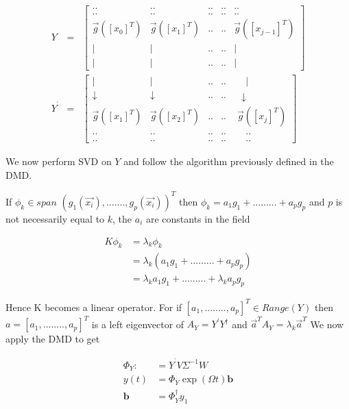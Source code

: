 \documentclass[12pt]{report}
\begin{document}
\begin{eqnarray*}
Y &=&%
\begin{bmatrix}
.. & .. & .. & .. & .. \\ 
.. & .. & .. & .. & .. \\ 
\vec{g}([x_{0}]^{T}) & \vec{g}([x_{1}]^{T}) & .. & ..
& \vec{g}([x_{j-1}]^{T}) \\ 
| & | & .. & .. & | \\
| & | & .. & .. & |%
\end{bmatrix}
\\
Y^{^{\prime }} &=&%
\begin{bmatrix}
| & | & .. & .. & \phantom{-}| \\ 
\downarrow  & \downarrow  & .. & .. & \phantom{p}\downarrow  \\ 
\vec{g}([x_{1}]^{T}) & \vec{g}([x_{2}]^{T}) & .. & ..
& \phantom{i}\vec{g}([x_{j}]^{T}) \\ 
.. & .. & .. & .. & \phantom{-}.. \\ 
.. & .. & .. & .. & \phantom{-}..%
\end{bmatrix}%
\end{eqnarray*}

We now perform SVD on $Y$ and follow the algorithm previously defined in the DMD.

If $\phi _{k}\in span$ $(g_{1}(\vec{x_{i}}),.......,g_{p}(%
\vec{x_{i}}))^{T}$ then $\phi _{k}=a_{1}g_{1}+.........+a_{p}g_{p}$ and $p$ is not necessarily equal to $k$, the $a_{i}$ are constants in the field

\begin{equation}
    \begin{aligned}
        K\phi _{k} &=\lambda _{k}\phi _{k} \\
        &=\lambda _{k}(a_{1}g_{1}+.........+a_{p}g_{p}) \\
        &=\lambda _{k}a_{1}g_{1}+.........+\lambda _{k}a_{p}g_{p}
    \end{aligned}
\end{equation}

Hence K becomes a linear operator. For if  $[a_{1},........,a_{p}]^{T}\in Range(Y)$ then $a=[a_{1},........,a_{p}]^{T}$ is a left eigenvector of $A_{Y}=Y^{\prime}Y^{\dagger}$ and $\vec{a}^{T}A_{Y}=\lambda _{k}\vec{a}^{T}$ We now apply the DMD to get

\begin{equation}
    \begin{aligned}
        \Phi _{Y}:&=Y^{^{\prime }}V\Sigma ^{-1}W \\
        y(t) &=\Phi _{Y}\exp (\Omega t)\mathbf{b} \\
        \mathbf{b} &=\Phi _{Y}^{\dagger}y_{1}
    \end{aligned}
\end{equation}
\end{document}
